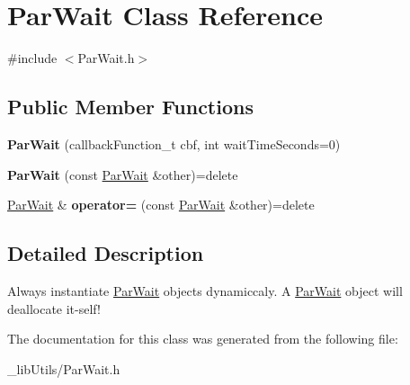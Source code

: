 \hypertarget{class_par_wait}{}\section{Par\+Wait Class Reference}
\label{class_par_wait}


{\ttfamily \#include $<$Par\+Wait.\+h$>$}

\subsection*{Public Member Functions}
\begin{DoxyCompactItemize}
\item 
{\bfseries Par\+Wait} (callback\+Function\+\_\+t cbf, int wait\+Time\+Seconds=0)\hypertarget{class_par_wait_ab369159efc089a70d7be3b5c7cb12d74}{}\label{class_par_wait_ab369159efc089a70d7be3b5c7cb12d74}

\item 
{\bfseries Par\+Wait} (const \hyperlink{class_par_wait}{Par\+Wait} \&other)=delete\hypertarget{class_par_wait_a63da26de5c61e94edf72df63b85bb577}{}\label{class_par_wait_a63da26de5c61e94edf72df63b85bb577}

\item 
\hyperlink{class_par_wait}{Par\+Wait} \& {\bfseries operator=} (const \hyperlink{class_par_wait}{Par\+Wait} \&other)=delete\hypertarget{class_par_wait_aaf6876b1f496bc44eb7f305aac839e5d}{}\label{class_par_wait_aaf6876b1f496bc44eb7f305aac839e5d}

\end{DoxyCompactItemize}


\subsection{Detailed Description}
Always instantiate \hyperlink{class_par_wait}{Par\+Wait} objects dynamiccaly. A \hyperlink{class_par_wait}{Par\+Wait} object will deallocate it-\/self! 

The documentation for this class was generated from the following file\+:\begin{DoxyCompactItemize}
\item 
\+\_\+lib\+Utils/Par\+Wait.\+h\end{DoxyCompactItemize}
